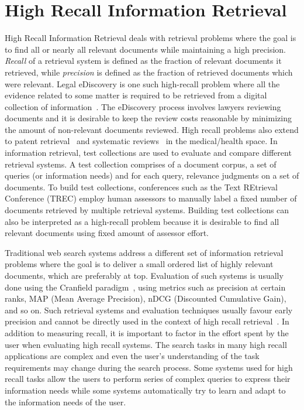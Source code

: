 \label{chap:rel}


\section{High Recall Information Retrieval}

High Recall Information Retrieval deals with retrieval problems where the goal
is to find all or nearly all relevant documents while maintaining a high
precision. \textit{Recall} of a retrieval system is defined as the fraction of
relevant documents it retrieved, while \textit{precision} is defined as the
fraction of retrieved documents which were relevant. Legal eDiscovery is one
such high-recall problem where all the evidence related to some matter is
required to be retrieved from a digital collection of
information~\cite{oard2013information,oard2010evaluation}. The eDiscovery
process involves lawyers reviewing documents and it is desirable to keep the
review costs reasonable by minimizing the amount of non-relevant documents
reviewed. High recall problems also extend to patent
retrieval~\cite{lupu2013patent} and systematic reviews~\cite{yu2016read} in the
medical/health space. In information retrieval, test collections are used to
evaluate and compare different retrieval systems. A test collection comprises of
a document corpus, a set of queries (or information needs) and for each query,
relevance judgments on a set of documents. To build test collections,
conferences such as the Text REtrieval Conference (TREC) employ human assessors
to manually label a fixed number of documents retrieved by multiple retrieval
systems.  Building test collections can also be interpreted as a high-recall
problem because it is desirable to find all relevant documents using fixed
amount of assessor effort.

Traditional web search systems address a different set of information retrieval
problems where the goal is to deliver a small ordered list of highly relevant
documents, which are preferably at top.  Evaluation of such systems is usually
done using the Cranfield paradigm~\cite{voorhees2001philosophy}, using metrics
such as precision at certain ranks, MAP (Mean Average Precision), nDCG
(Discounted Cumulative Gain), and so on. Such retrieval systems and evaluation
techniques usually favour early precision and cannot be directly used in the
context of high recall retrieval~\cite{magdy2010pres,roegiest2017design}. In
addition to measuring recall, it is important to factor in the effort spent by
the user when evaluating high recall systems. The search tasks in many high
recall applications are complex and even the user's understanding of the task
requirements may change during the search process. Some systems used for high
recall tasks allow the users to perform series of complex queries to express
their information needs while some systems automatically try to learn and adapt
to the information needs of the user.

